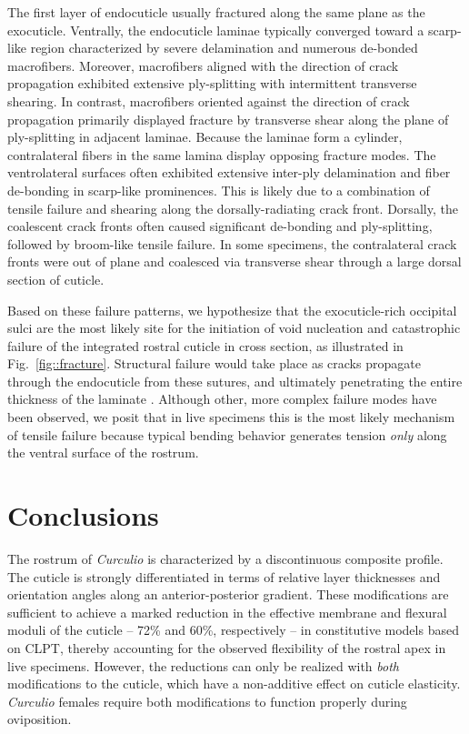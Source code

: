 \documentclass[twocolumn, linenumbers, superscriptaddress, nofootinbib]{revtex4-1}
\begin{document}
		The first layer of endocuticle usually fractured along the same plane as the exocuticle.
		Ventrally, the endocuticle laminae typically converged toward a scarp-like region characterized by severe delamination and numerous de-bonded macrofibers.
		Moreover, macrofibers aligned with the direction of crack propagation exhibited extensive ply-splitting with intermittent transverse shearing.
		In contrast, macrofibers oriented against the direction of crack propagation primarily displayed fracture by transverse shear along the plane of ply-splitting in adjacent laminae.
		Because the laminae form a cylinder, contralateral fibers in the same lamina display opposing fracture modes.
		The ventrolateral surfaces often exhibited extensive inter-ply delamination and fiber de-bonding in scarp-like prominences.
		This is likely due to a combination of tensile failure and shearing along the dorsally-radiating crack front.
		Dorsally, the coalescent crack fronts often caused significant de-bonding and ply-splitting, followed by broom-like tensile failure.
		In some specimens, the contralateral crack fronts were out of plane and coalesced via transverse shear through a large dorsal section of cuticle.
		
		Based on these failure patterns, we hypothesize that the exocuticle-rich occipital sulci are the most likely site for the initiation of void nucleation and catastrophic failure of the integrated rostral cuticle in cross section, as illustrated in Fig.~\ref{fig::fracture}.
		Structural failure would take place as cracks propagate through the endocuticle from these sutures, and ultimately penetrating the entire thickness of the laminate \cite{Davis2014}.
		Although other, more complex failure modes have been observed, we posit that in live specimens this is the most likely mechanism of tensile failure because typical bending behavior generates tension \emph{only} along the ventral surface of the rostrum.

	\section{Conclusions}
		The rostrum of \textit{Curculio} is characterized by a discontinuous composite profile.
		The cuticle is strongly differentiated in terms of relative layer thicknesses and orientation angles along an anterior-posterior gradient.		
		These modifications are sufficient to achieve a marked reduction in the effective membrane and flexural moduli of the cuticle -- 72\% and 60\%, respectively -- in constitutive models based on CLPT, thereby accounting for the observed flexibility of the rostral apex in live specimens.
		However, the reductions can only be realized with \emph{both} modifications to the cuticle, which have a non-additive effect on cuticle elasticity.
		\textit{Curculio} females require both modifications to function properly during oviposition.
	
\end{document}

